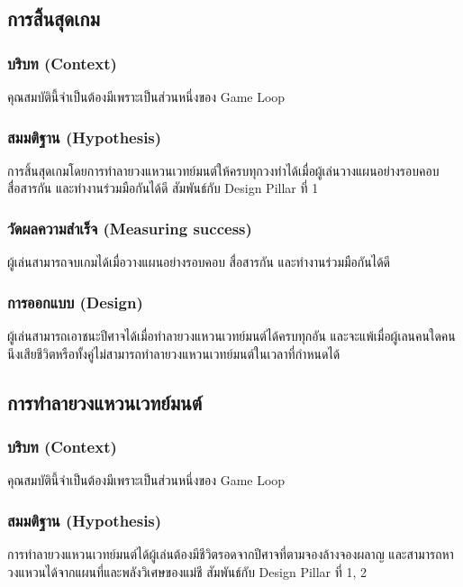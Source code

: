 \subsection{การสิ้นสุดเกม}

\subsubsection{บริบท (Context)}

คุณสมบัตินี้จำเป็นต้องมีเพราะเป็นส่วนหนึ่งของ Game Loop

\subsubsection{สมมติฐาน (Hypothesis)}

การสิ้นสุดเกมโดยการทำลายวงแหวนเวทย์มนต์ให้ครบทุกวงทำได้เมื่อผู้เล่นวางแผนอย่างรอบคอบ สื่อสารกัน และทำงานร่วมมือกันได้ดี สัมพันธ์กับ Design Pillar ที่ 1

\subsubsection{วัดผลความสำเร็จ (Measuring success)}
ผู้เล่นสามารถจบเกมได้เมื่อวางแผนอย่างรอบคอบ สื่อสารกัน และทำงานร่วมมือกันได้ดี

\subsubsection{การออกแบบ (Design)}

ผู้เล่นสามารถเอาชนะปีศาจได้เมื่อทำลายวงแหวนเวทย์มนต์ได้ครบทุกอัน และจะแพ้เมื่อผู้เลนคนใดคนนึงเสียชีวิตหรือทั้งคู่ไม่สามารถทำลายวงแหวนเวทย์มนต์ในเวลาที่กำหนดได้

\subsection{การทำลายวงแหวนเวทย์มนต์}

\subsubsection{บริบท (Context)}

คุณสมบัตินี้จำเป็นต้องมีเพราะเป็นส่วนหนึ่งของ Game Loop

\subsubsection{สมมติฐาน (Hypothesis)}

การทำลายวงแหวนเวทย์มนต์ได้ผู้เล่นต้องมีชีวิตรอดจากปีศาจที่ตามจองล้างจองผลาญ และสามารถหาวงแหวนได้จากแผนที่และพลังวิเศษของแม่ชี สัมพันธ์กับ Design Pillar ที่ 1, 2

